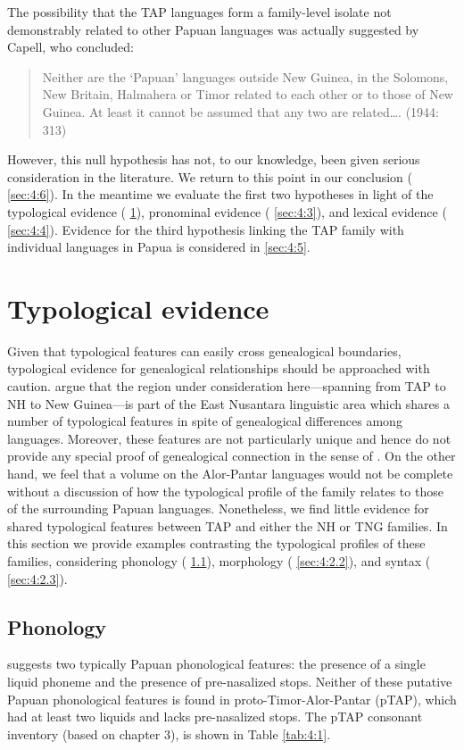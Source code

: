 The possibility that the TAP languages form a family-level isolate not demonstrably related to other Papuan languages was actually suggested by Capell, who concluded:

\begin{quote}
Neither are the `Papuan' languages outside New Guinea, in the Solomons, New Britain, Halmahera or Timor related to each other or to those of New Guinea. At least it cannot be assumed that any two are related{\dots}. (1944: 313)
\end{quote}

However, this null hypothesis has not, to our knowledge, been given serious consideration in the literature. We return to this point in our conclusion ({\SS} \ref{sec:4:6}). In the meantime we evaluate the first two hypotheses in light of the typological evidence ({\SS} \ref{sec:4:2}), pronominal evidence ({\SS} \ref{sec:4:3}), and lexical evidence ({\SS} \ref{sec:4:4}). Evidence for the third hypothesis linking the TAP family with individual languages in Papua is considered in {\SS} \ref{sec:4:5}.

\section{Typological evidence}\label{sec:4:2}
Given that typological features can easily cross genealogical boundaries, typological evidence for genealogical relationships should be approached with caution. \citet{KlamerEtAl2008} argue that the region under consideration here---spanning from TAP to NH to New Guinea---is part of the East Nusantara linguistic area which shares a number of typological features in spite of genealogical differences among languages. Moreover, these features are not particularly unique and hence do not provide any special proof of genealogical connection in the sense of \citet{Meillet1967}. On the other hand, we feel that a volume on the Alor-Pantar languages would not be complete without a discussion of how the typological profile of the family relates to those of the surrounding Papuan languages. Nonetheless, we find little evidence for shared typological features between TAP and either the NH or TNG families. In this section we provide examples contrasting the typological profiles of these families, considering phonology ({\SS} \ref{sec:4:2.1}), morphology ({\SS} \ref{sec:4:2.2}), and syntax ({\SS} \ref{sec:4:2.3}).

\subsection{Phonology}\label{sec:4:2.1}
\citet{Foley1998} suggests two typically Papuan phonological features: the presence of a single liquid phoneme and the presence of pre-nasalized stops. Neither of these putative Papuan phonological features is found in proto-Timor-Alor-Pantar (pTAP), which had at least two liquids and lacks pre-nasalized stops. The pTAP consonant inventory (based on chapter 3), is shown in Table \ref{tab:4:1}.


